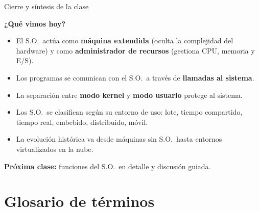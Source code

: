 \documentclass[xcolor=svgnames]{beamer}
\begin{document}
\begin{frame}{Cierre y síntesis de la clase}

  \textbf{¿Qué vimos hoy?}

  \vspace{0.3cm}

  \begin{itemize}
    \item[\textcolor{mqred}{\ding{51}}] El S.O.\ actúa como \textbf{máquina extendida} (oculta la complejidad del hardware) y como \textbf{administrador de recursos} (gestiona CPU, memoria y E/S).
    \item[\textcolor{mqred}{\ding{51}}] Los programas se comunican con el S.O.\ a través de \textbf{llamadas al sistema}.
    \item[\textcolor{mqred}{\ding{51}}] La separación entre \textbf{modo kernel} y \textbf{modo usuario} protege al sistema.
    \item[\textcolor{mqred}{\ding{51}}] Los S.O.\ se clasifican según su entorno de uso: lote, tiempo compartido, tiempo real, embebido, distribuido, móvil.
    \item[\textcolor{mqred}{\ding{51}}] La evolución histórica va desde máquinas sin S.O.\ hasta entornos virtualizados en la nube.
  \end{itemize}

  \vspace{0.3cm}
  \begin{center}
    \textbf{Próxima clase:} funciones del S.O.\ en detalle y discusión guiada.
  \end{center}

\end{frame}

\section{Glosario de términos}
\end{document}
